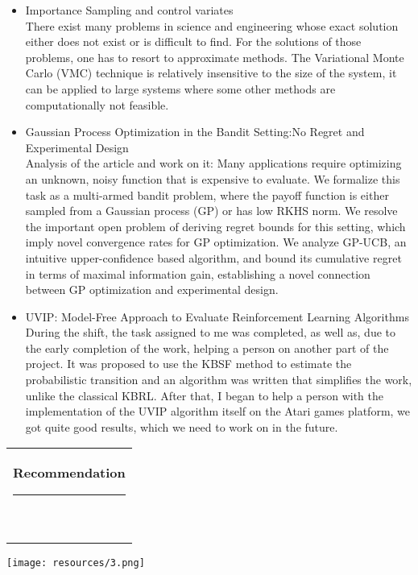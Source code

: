 \documentclass[10pt,A4,english]{article}
\newcommand{\mpwidth}{\linewidth-\fboxsep-\fboxsep}
\newcommand{\cvtext}[1] {
	\begin{tabular*}{1\mpwidth}{p{0.98\mpwidth}}
		\parbox{1\mpwidth}{#1}
	\end{tabular*}
}
\newcommand{\cvsection}[1] {
	\vspace{14pt}
	\cvtext{
		\textbf{\LARGE{\textcolor{darkcol}{#1}}}\\[-4pt]
		\textcolor{accentcol}{ \rule{0.2\textwidth}{1.5pt} } \\
	}
}
\begin{document}
\begin{paracol}{2}
\begin{rightcolumn}
\begin{itemize}[leftmargin=*]
    \item Importance Sampling and control variates\\
    There exist many problems in science and engineering whose exact solution
either does not exist or is difficult to find. For the solutions of those
problems, one has to resort to approximate methods. The Variational
Monte Carlo (VMC) technique is relatively insensitive to the size of the
system, it can be applied to large systems where some other methods are
computationally not feasible.
    \item Gaussian Process Optimization in the Bandit Setting:No
Regret and Experimental Design\\
    Analysis of the article and work on it: Many applications require optimizing an unknown, noisy function that is   expensive to evaluate. We formalize  this  task  as  a  multi-armed bandit problem, where the payoff function is either sampled from a Gaussian process (GP) or has low RKHS norm. We resolve the important open problem of deriving regret bounds for this setting, which imply novel convergence rates for  GP  optimization. We  analyze GP-UCB, an intuitive upper-confidence based algorithm, and bound its cumulative regret in terms of maximal information gain, establishing a novel connection between GP optimization and experimental design.
	\item UVIP: Model-Free Approach to Evaluate Reinforcement Learning Algorithms\\
    During the shift, the task assigned to me was completed, as well as, due to the early completion of the work, helping a person on another part of the project. It was proposed to use the KBSF method to estimate the probabilistic transition and an algorithm was written that simplifies the work, unlike the classical KBRL. After that, I began to help a person with the implementation of the UVIP algorithm itself on the Atari games platform, we got quite good results, which we need to work on in the future.
\end{itemize}

\cvsection{Recommendation}
    \newline
    \texttt{[image: resources/3.png]}

\end{rightcolumn}
\end{paracol}
\end{document}
